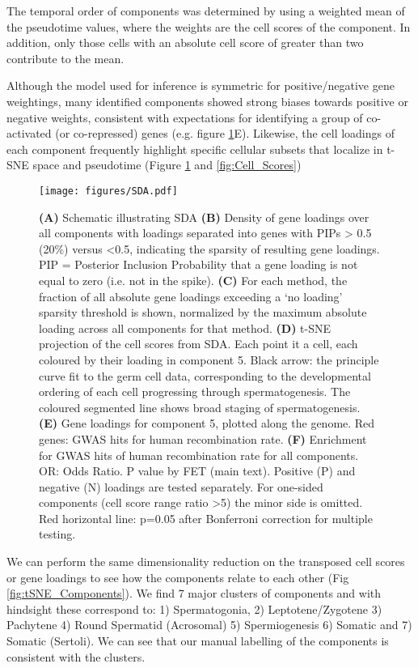 The temporal order of components was determined by using a weighted mean of the pseudotime values, where the weights are the cell scores of the component. In addition, only those cells with an absolute cell score of greater than two contribute to the mean.

Although the model used for inference is symmetric for positive/negative gene weightings, many identified components showed strong biases towards positive or negative weights, consistent with expectations for identifying a group of co-activated (or co-repressed) genes (e.g. figure \ref{fig:SDA}E). Likewise, the cell loadings of each component frequently highlight specific cellular subsets that localize in t-SNE space and pseudotime (Figure \ref{fig:SDA} and \ref{fig:Cell_Scores})

\begin{figure}[H]
	\centering
	\texttt{[image: figures/SDA.pdf]}
	\caption{
		\textbf{(A)} Schematic illustrating SDA
		\textbf{(B)} Density of gene loadings over all components with loadings separated into genes with PIPs > 0.5 (20\%) versus <0.5, indicating the sparsity of resulting gene loadings. PIP = Posterior Inclusion Probability that a gene loading is not equal to zero (i.e. not in the spike).
		\textbf{(C)} For each method, the fraction of all absolute gene loadings exceeding a ‘no loading’ sparsity threshold is shown, normalized by the maximum absolute loading across all components for that method. 
		\textbf{(D)} t-SNE projection of the cell scores from SDA. Each point it a cell, each coloured by their loading in component 5. Black arrow: the principle curve fit to the germ cell data, corresponding to the developmental ordering of each cell progressing through spermatogenesis. The coloured segmented line shows broad staging of spermatogenesis.
		\textbf{(E)} Gene loadings for component 5, plotted along the genome. Red genes: GWAS hits for human recombination rate.
		\textbf{(F)} Enrichment for GWAS hits of human recombination rate for all components. OR: Odds Ratio. P value by FET (main text). Positive (P) and negative (N) loadings are tested separately. For one-sided components (cell score range ratio >5) the minor side is omitted. Red horizontal line: p=0.05 after Bonferroni correction for multiple testing.
	}
	\label{fig:SDA}
\end{figure}

We can perform the same dimensionality reduction on the transposed cell scores or gene loadings to see how the components relate to each other (Fig \ref{fig:tSNE_Components}). We find 7 major clusters of components and with hindsight these correspond to: 1) Spermatogonia, 2) Leptotene/Zygotene 3) Pachytene 4) Round Spermatid (Acrosomal) 5) Spermiogenesis 6) Somatic and 7) Somatic (Sertoli). We can see that our manual labelling of the components is consistent with the clusters.

